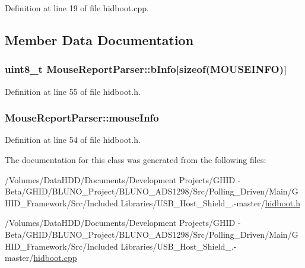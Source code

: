 \-Definition at line 19 of file hidboot.\-cpp.



\subsection{\-Member \-Data \-Documentation}
\hypertarget{class_mouse_report_parser_aa12ee1ccfc7bf834268ab6546c11998c}{
\subsubsection[{b\-Info}]{\setlength{\rightskip}{0pt plus 5cm}uint8\-\_\-t {\bf \-Mouse\-Report\-Parser\-::b\-Info}\mbox{[}sizeof({\bf \-M\-O\-U\-S\-E\-I\-N\-F\-O})\mbox{]}}}\label{class_mouse_report_parser_aa12ee1ccfc7bf834268ab6546c11998c}


\-Definition at line 55 of file hidboot.\-h.

\hypertarget{class_mouse_report_parser_a9daf20ab8deb57500426e40827b0a79c}{
\subsubsection[{mouse\-Info}]{ {\bf \-Mouse\-Report\-Parser\-::mouse\-Info}}}\label{class_mouse_report_parser_a9daf20ab8deb57500426e40827b0a79c}


\-Definition at line 54 of file hidboot.\-h.



\-The documentation for this class was generated from the following files\-:\begin{DoxyCompactItemize}
\item 
/\-Volumes/\-Data\-H\-D\-D/\-Documents/\-Development Projects/\-G\-H\-I\-D -\/ Beta/\-G\-H\-I\-D/\-B\-L\-U\-N\-O\-\_\-\-Project/\-B\-L\-U\-N\-O\-\_\-\-A\-D\-S1298/\-Src/\-Polling\-\_\-\-Driven/\-Main/\-G\-H\-I\-D\-\_\-\-Framework/\-Src/\-Included Libraries/\-U\-S\-B\-\_\-\-Host\-\_\-\-Shield\-\_.-\/master/\hyperlink{hidboot_8h}{hidboot.\-h}\item 
/\-Volumes/\-Data\-H\-D\-D/\-Documents/\-Development Projects/\-G\-H\-I\-D -\/ Beta/\-G\-H\-I\-D/\-B\-L\-U\-N\-O\-\_\-\-Project/\-B\-L\-U\-N\-O\-\_\-\-A\-D\-S1298/\-Src/\-Polling\-\_\-\-Driven/\-Main/\-G\-H\-I\-D\-\_\-\-Framework/\-Src/\-Included Libraries/\-U\-S\-B\-\_\-\-Host\-\_\-\-Shield\-\_.-\/master/\hyperlink{hidboot_8cpp}{hidboot.\-cpp}\end{DoxyCompactItemize}
